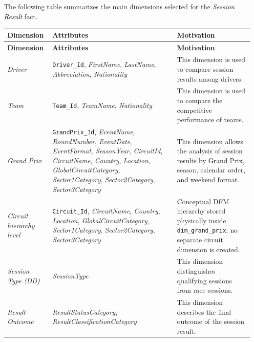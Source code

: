 \documentclass[a4paper,11pt]{article}
\begin{document}
	The following table summarizes the main dimensions selected for the
	\textit{Session Result} fact.
	
	\begin{longtable}{|p{3cm}|p{5.3cm}|p{6.5cm}|}
		\hline
		\textbf{Dimension} & \textbf{Attributes} & \textbf{Motivation} \\
		\hline
		\endfirsthead
		
		\hline
		\textbf{Dimension} & \textbf{Attributes} & \textbf{Motivation} \\
		\hline
		\endhead
		
		\textit{Driver}
		& \texttt{Driver\_Id}, \textit{FirstName}, \textit{LastName}, \textit{Abbreviation},
		\textit{Nationality}
		& This dimension is used to compare session results among drivers. \\
		\hline
		
		\textit{Team}
		& \texttt{Team\_Id}, \textit{TeamName}, \textit{Nationality}
		& This dimension is used to compare the competitive performance of teams. \\
		\hline
		
		\textit{Grand Prix}
		& \texttt{GrandPrix\_Id}, \textit{EventName}, \textit{RoundNumber}, \textit{EventDate},
		\textit{EventFormat}, \textit{SeasonYear}, \textit{CircuitId}, \textit{CircuitName},
		\textit{Country}, \textit{Location}, \textit{GlobalCircuitCategory},
		\textit{Sector1Category}, \textit{Sector2Category}, \textit{Sector3Category}
		& This dimension allows the analysis of session results by Grand Prix, season,
		calendar order, and weekend format. \\
		\hline
		
		\textit{Circuit hierarchy level}
		& \texttt{Circuit\_Id}, \textit{CircuitName}, \textit{Country}, \textit{Location},
		\textit{GlobalCircuitCategory}, \textit{Sector1Category}, \textit{Sector2Category},
		\textit{Sector3Category}
		& Conceptual DFM hierarchy stored physically inside \texttt{dim\_grand\_prix};
		no separate circuit dimension is created. \\
		\hline
		
		\textit{Session Type (DD)}
		& \textit{SessionType}
		& This dimension distinguishes qualifying sessions from race sessions.  \\
		\hline
		
		\textit{Result Outcome}
		& \textit{ResultStatusCategory}, \textit{ResultClassificationCategory}
		& This dimension describes the final outcome of the session result. \\
		\hline
		

\end{longtable}
\end{document}
